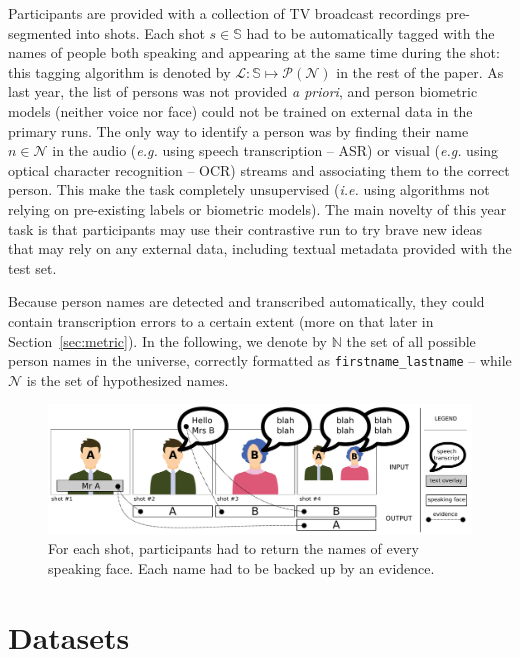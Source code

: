 \documentclass{acm_proc_article-me}
\newcommand\refNames{\mathbb{N}}
\newcommand\shots{\mathbb{S}}
\newcommand\hypLabels{\mathcal{L}}
\newcommand\hypNames{\mathcal{N}}
\begin{document}
Participants are provided with a collection of TV broadcast recordings pre-segmented into shots.
Each shot $s \in \shots$ had to be automatically tagged with the names of people both speaking and appearing at the same time during the shot: this tagging algorithm is denoted by $\hypLabels : \shots \mapsto \mathcal{P}(\hypNames)$ in the rest of the paper.
As last year, the list of persons was not provided \emph{a priori}, and person biometric models (neither voice nor face) could not be trained on external data in the primary runs. The only way to identify a person was by finding their name $n \in \hypNames$ in the audio (\emph{e.g.} using speech transcription -- ASR) or visual (\emph{e.g.} using optical character recognition -- OCR) streams and associating them to the correct person. This make the task completely unsupervised (\emph{i.e.} using algorithms not relying on pre-existing labels or biometric models). The main novelty of this year task is that participants may use their contrastive run to try brave new ideas that may rely on any external data, including textual metadata provided with the test set.

Because person names are detected and transcribed automatically, they could contain transcription errors to a certain extent (more on that later in Section~\ref{sec:metric}). In the following, we denote by $\refNames$ the set of all possible person names in the universe, correctly formatted as \texttt{firstname\_lastname} -- while $\hypNames$ is the set of hypothesized names.

\begin{figure}[!htb]
 \centering
 \includegraphics[width=1.\linewidth]{figs/evidence.pdf}
 \vspace{-0.5cm}
 \caption{For each shot, participants had to return the names of every speaking face. Each name had to be backed up by an evidence.}
 \label{fig:evidence}
\end{figure}

\vspace{-0.1cm}
\section{Datasets}
\end{document}
